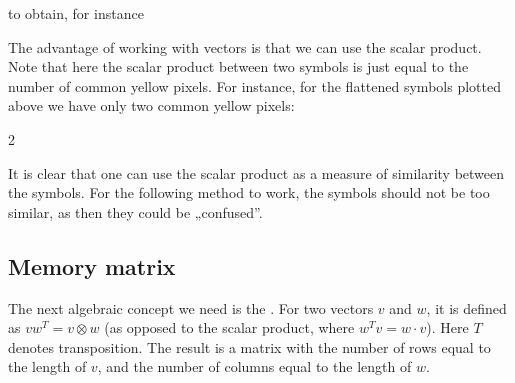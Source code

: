 \documentclass[a4paper,12pt,polish]{jupyterBook}
\begin{document}
\sphinxAtStartPar
to obtain, for instance
\begin{sphinxVerbatimOutput}

\noindent{}
\end{sphinxVerbatimOutput}
\begin{sphinxVerbatimOutput}

\noindent{}
\end{sphinxVerbatimOutput}

\sphinxAtStartPar
The advantage of working with vectors is that we can use the scalar product. Note that here the scalar product between two symbols is just equal to the number of common yellow pixels. For instance, for the flattened symbols plotted above we have only two common yellow pixels:
\begin{sphinxVerbatimInput}

\begin{sphinxVerbatim}[commandchars=\\\{\}]
\end{sphinxVerbatim}
\end{sphinxVerbatimInput}
\begin{sphinxVerbatimOutput}

\begin{sphinxVerbatim}[commandchars=\\\{\}]
2
\end{sphinxVerbatim}
\end{sphinxVerbatimOutput}

\sphinxAtStartPar
It is clear that one can use the scalar product as a measure of similarity between the symbols. For the following method to work, the symbols should not be too similar, as then they could be „confused”.


\subsection{Memory matrix}
\label{\detokenize{docs/memory:memory-matrix}}
\sphinxAtStartPar
The next algebraic concept we need is the . For two vectors \(v\) and \(w\), it is defined as \(v w^T = v \otimes w\) (as opposed to the scalar product, where \(w^T v = w \cdot v\)). Here \(T\) denotes transposition. The result is a matrix with the number of rows equal to the length of \(v\), and the number of columns equal to the length of \(w\).
\end{document}
